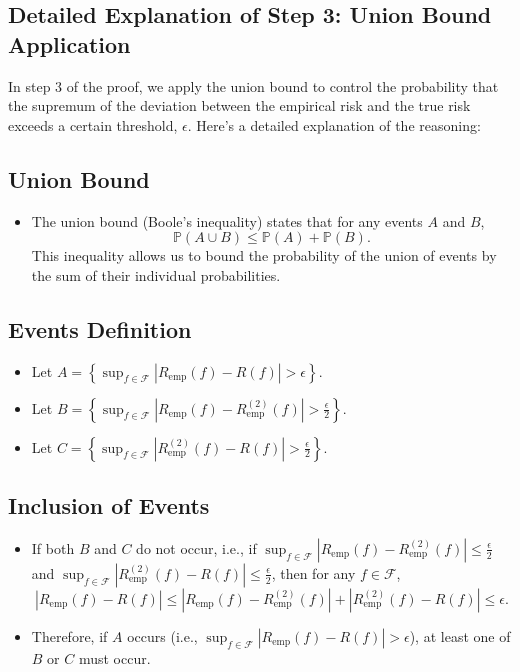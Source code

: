 \begin{notechapter}
\section{Detailed Explanation of Step 3: Union Bound Application}

In step 3 of the proof, we apply the union bound to control the probability that the supremum of the deviation between the empirical risk and the true risk exceeds a certain threshold, \( \epsilon \). Here's a detailed explanation of the reasoning:

\subsection{Union Bound}
\begin{itemize}
   \item The union bound (Boole's inequality) states that for any events \( A \) and \( B \),
         \[
         \mathbb{P}(A \cup B) \leq \mathbb{P}(A) + \mathbb{P}(B).
         \]
         This inequality allows us to bound the probability of the union of events by the sum of their individual probabilities.
\end{itemize}

\subsection{Events Definition}
\begin{itemize}
   \item Let \( A = \left\{ \sup_{f \in \mathcal{F}} |R_{\text{emp}}(f) - R(f)| > \epsilon \right\} \).
   \item Let \( B = \left\{ \sup_{f \in \mathcal{F}} |R_{\text{emp}}(f) - R_{\text{emp}}^{(2)}(f)| > \frac{\epsilon}{2} \right\} \).
   \item Let \( C = \left\{ \sup_{f \in \mathcal{F}} |R_{\text{emp}}^{(2)}(f) - R(f)| > \frac{\epsilon}{2} \right\} \).
\end{itemize}

\subsection{Inclusion of Events}
\begin{itemize}
   \item If both \( B \) and \( C \) do not occur, i.e., if \( \sup_{f \in \mathcal{F}} |R_{\text{emp}}(f) - R_{\text{emp}}^{(2)}(f)| \leq \frac{\epsilon}{2} \) and \( \sup_{f \in \mathcal{F}} |R_{\text{emp}}^{(2)}(f) - R(f)| \leq \frac{\epsilon}{2} \), then for any \( f \in \mathcal{F} \),
         \[
         |R_{\text{emp}}(f) - R(f)| \leq |R_{\text{emp}}(f) - R_{\text{emp}}^{(2)}(f)| + |R_{\text{emp}}^{(2)}(f) - R(f)| \leq \epsilon.
         \]
   \item Therefore, if \( A \) occurs (i.e., \( \sup_{f \in \mathcal{F}} |R_{\text{emp}}(f) - R(f)| > \epsilon \)), at least one of \( B \) or \( C \) must occur.
\end{itemize}


\end{notechapter}

